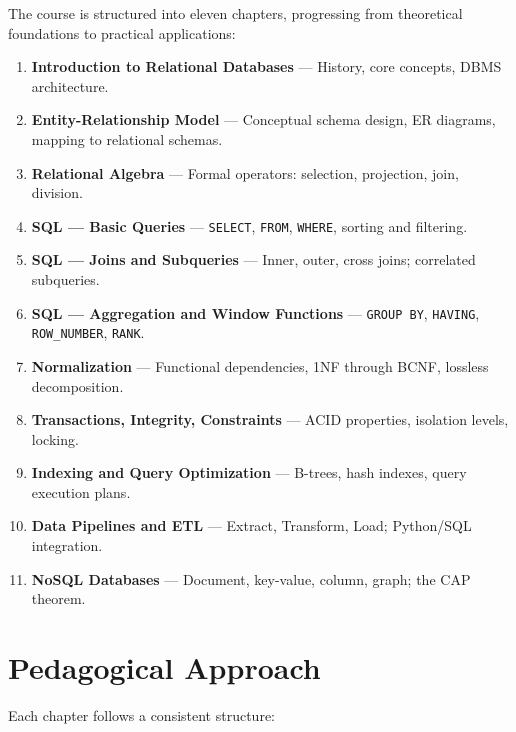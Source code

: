 The course is structured into eleven chapters, progressing from theoretical
foundations to practical applications:

\begin{enumerate}
    \item \textbf{Introduction to Relational Databases} ---
          History, core concepts, DBMS architecture.
    \item \textbf{Entity-Relationship Model} ---
          Conceptual schema design, ER diagrams, mapping to relational schemas.
    \item \textbf{Relational Algebra} ---
          Formal operators: selection, projection, join, division.
    \item \textbf{SQL --- Basic Queries} ---
          \texttt{SELECT}, \texttt{FROM}, \texttt{WHERE}, sorting and filtering.
    \item \textbf{SQL --- Joins and Subqueries} ---
          Inner, outer, cross joins; correlated subqueries.
    \item \textbf{SQL --- Aggregation and Window Functions} ---
          \texttt{GROUP BY}, \texttt{HAVING}, \texttt{ROW\_NUMBER}, \texttt{RANK}.
    \item \textbf{Normalization} ---
          Functional dependencies, 1NF through BCNF, lossless decomposition.
    \item \textbf{Transactions, Integrity, Constraints} ---
          ACID properties, isolation levels, locking.
    \item \textbf{Indexing and Query Optimization} ---
          B-trees, hash indexes, query execution plans.
    \item \textbf{Data Pipelines and ETL} ---
          Extract, Transform, Load; Python/SQL integration.
    \item \textbf{NoSQL Databases} ---
          Document, key-value, column, graph; the CAP theorem.
\end{enumerate}

\section*{Pedagogical Approach}

Each chapter follows a consistent structure:

